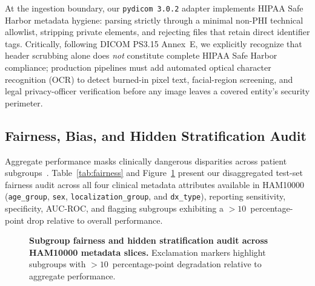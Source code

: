 At the ingestion boundary, our \texttt{pydicom 3.0.2} adapter implements HIPAA Safe Harbor metadata hygiene: parsing strictly through a minimal non-PHI technical allowlist, stripping private elements, and rejecting files that retain direct identifier tags. Critically, following DICOM PS3.15 Annex~E, we explicitly recognize that header scrubbing alone does \emph{not} constitute complete HIPAA Safe Harbor compliance; production pipelines must add automated optical character recognition (OCR) to detect burned-in pixel text, facial-region screening, and legal privacy-officer verification before any image leaves a covered entity's security perimeter.

\subsection{Fairness, Bias, and Hidden Stratification Audit}
Aggregate performance masks clinically dangerous disparities across patient subgroups~\cite{OakdenRayner2020hidden,Gianfrancesco2018potential,Obermeyer2019dissecting,Rajkomar2018scalable}. Table~\ref{tab:fairness} and Figure~\ref{fig:fairness} present our disaggregated test-set fairness audit across all four clinical metadata attributes available in HAM10000 (\texttt{age\_group}, \texttt{sex}, \texttt{localization\_group}, and \texttt{dx\_type}), reporting sensitivity, specificity, AUC-ROC, and flagging subgroups exhibiting a $>10$~percentage-point drop relative to overall performance.

\begin{table}[htbp]
\centering
\caption{\textbf{Subgroup fairness and hidden stratification audit on the HAM10000 test split.} Alerts flag subgroups with sensitivity or AUC dropping $>10$~pp below the aggregate test score~\cite{OakdenRayner2020hidden}.}
\label{tab:fairness}
\small

\end{table}

\begin{figure}[htbp]
\centering
{}
\caption{\textbf{Subgroup fairness and hidden stratification audit across HAM10000 metadata slices.} Exclamation markers highlight subgroups with $>10$~percentage-point degradation relative to aggregate performance.}
\label{fig:fairness}
\end{figure}

